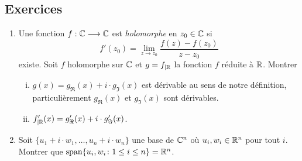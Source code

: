 









\subsection*{Exercices} 

\begin{enumerate}
\item Une fonction $f:\mathbb{C} \longrightarrow \mathbb{C}$ est \emph{holomorphe} en $z_0 \in \mathbb{C}$ si
  \begin{displaymath}
    f'(z_0) = \lim_{z \rightarrow z_0} \frac{f(z) - f(z_0)}{z - z_0} 
  \end{displaymath}
existe. Soit $f$ holomorphe sur $\mathbb{C}$ et $g = f_{|\mathbb{R}}$ la fonction $f$ réduite à $\mathbb{R}$. 
 Montrer 
\begin{enumerate}[i)]
\item  $g(x) = g_\Re(x) + i \cdot g_\Im(x)$ est dérivable au  sens de notre définition, particulièrement $g_\Re(x)$ et $ g_\Im(x)$ sont dérivables. 
\item $f'_{| \mathbb{R}} (x) = g'_\Re(x) + i \cdot g'_\Im(x)$. 
\end{enumerate}
\item Soit $\{u_1+ i \cdot w_1,\dots,u_n + i \cdot w_n\}$ une base de $\mathbb{C}^n$ où $u_i,w_i \in \mathbb{R}^n$  pour tout $i$. Montrer que $\operatorname{span}\{u_i, w_i \colon 1 \leq i \leq n\} = \mathbb{R}^n$. \label{item:5}
\end{enumerate}






